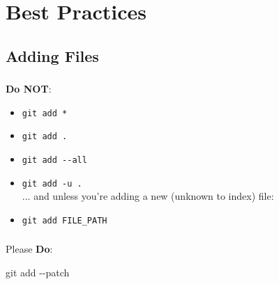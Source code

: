
\section{Best Practices}

\begin{frame}[plain]

  \begin{center}
    \Huge{\textbf{\insertsection}}
  \end{center}

\end{frame}


\subsection{Adding Files}

\begin{frame}

  \begin{center}
    \Huge{\textbf{\insertsubsection}}
  \end{center}

\end{frame}


\begin{frame}
  \frametitle{\insertsubsection}

  \textbf{Do NOT}:
  \begin{itemize}
    \item \texttt{git add *}
    \item \texttt{git add .}
    \item \texttt{git add -{}-all}\\
    \item \texttt{git add -u .}\\
    ... and unless you're adding a new (unknown to index) file:
    \item \texttt{git add FILE\_PATH}
  \end{itemize}
\end{frame}


\begin{frame}
  \frametitle{\insertsubsection}

  Please \textbf{Do}:\vspacing
  \begin{center}
    \Huge{git add -{}-patch}
  \end{center}
\end{frame}

